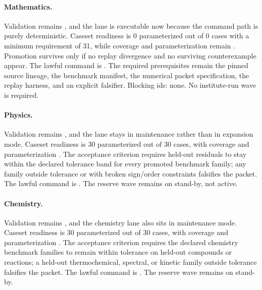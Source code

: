 \paragraph{Mathematics.}
Validation remains , and the lane is executable now because the
command path is purely deterministic. Caseset readiness is 0 parameterized out
of 0 cases with a minimum requirement of 31, while coverage and parameterization
remain . Promotion survives only if no replay divergence
and no surviving counterexample appear. The lawful command is
. The
required prerequisites remain the pinned source lineage, the benchmark manifest,
the numerical packet specification, the replay harness, and an explicit
falsifier. Blocking ids: none. No institute-run wave is required.

\paragraph{Physics.}
Validation remains , and the lane stays in maintenance rather than
in expansion mode. Caseset readiness is 30 parameterized out of 30 cases, with
coverage  and parameterization
. The acceptance criterion requires
held-out residuals to stay within the declared tolerance band for every
promoted benchmark family; any family outside tolerance or with broken
sign/order constraints falsifies the packet. The lawful command is
. The reserve wave
 remains on stand-by, not active.

\paragraph{Chemistry.}
Validation remains , and the chemistry lane also sits in
maintenance mode. Caseset readiness is 30 parameterized out of 30 cases, with
coverage  and parameterization
. The acceptance criterion requires
the declared chemistry benchmark families to remain within tolerance on
held-out compounds or reactions; a held-out thermochemical, spectral, or
kinetic family outside tolerance falsifies the packet. The lawful command is
. The reserve wave
 remains on stand-by.

